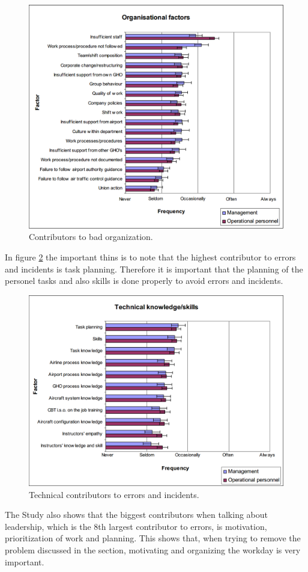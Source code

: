 \begin{figure}[!h]
\centering
\includegraphics[width=\textwidth]{Grafik/OrganisationalFactors}
\caption{Contributors to bad organization.}
\label{OrganisationalFactors}
\end{figure}

In figure \ref{TechnicalFactors} the important thins is to note that the highest contributor to errors and incidents is task planning. Therefore it is important that the planning of the personel tasks and also skills is done properly to avoid errors and incidents.

\begin{figure}[!h]
\centering
\includegraphics[width=\textwidth]{Grafik/TechnicalFactors}
\caption{Technical contributors to errors and incidents.}
\label{TechnicalFactors}
\end{figure}

The Study also shows that the biggest contributors when talking about leadership, which is the 8th largest contributor to errors, is motivation, prioritization of work and planning. This shows that, when trying to remove the problem discussed in the section, motivating and organizing the workday is very important.